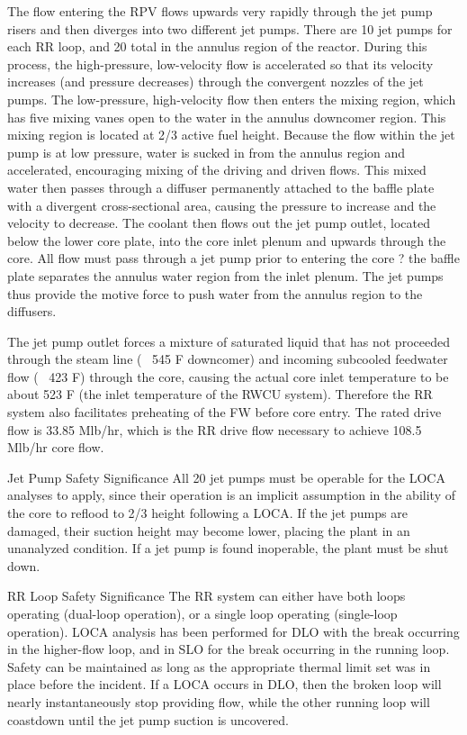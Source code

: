 \documentclass[10pt]{article}
\begin{document}
The flow entering the RPV flows upwards very rapidly through the jet pump risers and then diverges into two different jet pumps. There are 10 jet pumps for each RR loop, and 20 total in the annulus region of the reactor. During this process, the high-pressure, low-velocity flow is accelerated so that its velocity increases (and pressure decreases) through the convergent nozzles of the jet pumps. The low-pressure, high-velocity flow then enters the mixing region, which has five mixing vanes open to the water in the annulus downcomer region. This mixing region is located at 2/3 active fuel height. Because the flow within the jet pump is at low pressure, water is sucked in from the annulus region and accelerated, encouraging mixing of the driving and driven flows. This mixed water then passes through a diffuser permanently attached to the baffle plate with a divergent cross-sectional area, causing the pressure to increase and the velocity to decrease. The coolant then flows out the jet pump outlet, located below the lower core plate, into the core inlet plenum and upwards through the core. All flow must pass through a jet pump prior to entering the core ? the baffle plate separates the annulus water region from the inlet plenum. The jet pumps thus provide the motive force to push water from the annulus region to the diffusers. 

The jet pump outlet forces a mixture of saturated liquid that has not proceeded through the steam line (~ 545 F downcomer) and incoming subcooled feedwater flow (~ 423 F) through the core, causing the actual core inlet temperature to be about 523 F (the inlet temperature of the RWCU system). Therefore the RR system also facilitates preheating of the FW before core entry. The rated drive flow is 33.85 Mlb/hr, which is the RR drive flow necessary to achieve 108.5 Mlb/hr core flow. 

Jet Pump Safety Significance
All 20 jet pumps must be operable for the LOCA analyses to apply, since their operation is an implicit assumption in the ability of the core to reflood to 2/3 height following a LOCA. If the jet pumps are damaged, their suction height may become lower, placing the plant in an unanalyzed condition. If a jet pump is found inoperable, the plant must be shut down. 

RR Loop Safety Significance
The RR system can either have both loops operating (dual-loop operation), or a single loop operating (single-loop operation). LOCA analysis has been performed for DLO with the break occurring in the higher-flow loop, and in SLO for the break occurring in the running loop. Safety can be maintained as long as the appropriate thermal limit set was in place before the incident. If a LOCA occurs in DLO, then the broken loop will nearly instantaneously stop providing flow, while the other running loop will coastdown until the jet pump suction is uncovered. 
\end{document}
